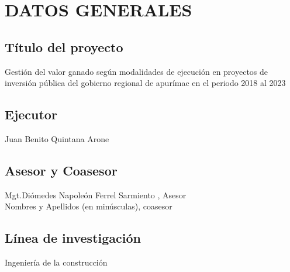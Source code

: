 \newpage
\chapter*{DATOS GENERALES}

\section*{Título del proyecto}
Gestión del valor ganado según modalidades de ejecución en proyectos de inversión pública del gobierno regional de apurímac en el periodo 2018 al 2023
\section*{Ejecutor} 
\noindent Juan Benito Quintana Arone

\section*{Asesor y Coasesor}
\noindent Mgt.Diómedes Napoleón Ferrel Sarmiento , Asesor\\
Nombres y Apellidos (en minúsculas), coasesor

\section*{Línea de investigación}
\noindent Ingeniería de la construcción

\newpage

